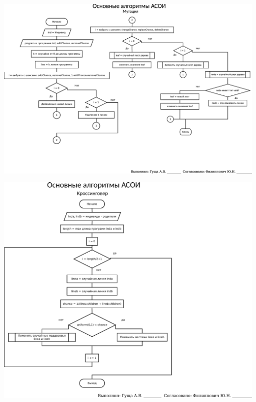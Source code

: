 \documentclass[russian,utf8, a1paper, emptystyle]{eskdgraph}
\begin{document}
\begin{ESKDdrawing}
\includegraphics[scale=0.99]{list4_1}
\end{ESKDdrawing}

\begin{ESKDdrawing}
\begin{flushright}
\includegraphics[scale=0.99]{list4_2}
\end{flushright}
\end{ESKDdrawing}
\end{document}
